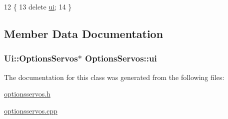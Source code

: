 \begin{DoxyCode}
12 \{
13     \textcolor{keyword}{delete} \hyperlink{class_options_servos_a12be3e1b7d59a94a23a30e90729882df}{ui};
14 \}
\end{DoxyCode}


\subsection{Member Data Documentation}
\hypertarget{class_options_servos_a12be3e1b7d59a94a23a30e90729882df}{}
\subsubsection[{ui}]{\setlength{\rightskip}{0pt plus 5cm}Ui\+::\+Options\+Servos$\ast$ Options\+Servos\+::ui\hspace{0.3cm}{\ttfamily [private]}}\label{class_options_servos_a12be3e1b7d59a94a23a30e90729882df}


The documentation for this class was generated from the following files\+:\begin{DoxyCompactItemize}
\item 
\hyperlink{optionsservos_8h}{optionsservos.\+h}\item 
\hyperlink{optionsservos_8cpp}{optionsservos.\+cpp}\end{DoxyCompactItemize}
